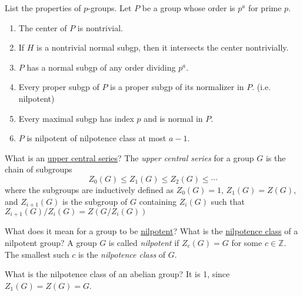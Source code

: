 \documentclass[avery5371,grid]{flashcards}
\newcommand{\Z}{\mathbb{Z}}
\begin{document}
\begin{flashcard}[Groups]{List the properties of $p$-groups.}
Let $P$ be a group whose order is $p^a$ for prime $p$.
 \begin{enumerate}
      \item The center of $P$ is nontrivial.
      \item If $H$ is a nontrivial normal subgp, then it intersects the center nontrivially.
      \item $P$ has a normal subgp of any order dividing $p^a$.
      \item Every proper subgp of $P$ is a proper subgp of its normalizer in $P$. (i.e. nilpotent)
      \item Every maximal subgp has index $p$ and is normal in $P$.
      \item $P$ is nilpotent of nilpotence class at most $a-1$.
 \end{enumerate}
\end{flashcard}

\begin{flashcard}[Groups]{What is an \underline{upper central series}?}
 The \emph{upper central series} for a group $G$ is the chain of subgroups
 $$
 Z_0(G) \leq Z_1(G) \leq Z_2(G) \leq \cdots
 $$
 where the subgroups are inductively defined as $Z_0(G) = 1$, $Z_1(G) = Z(G)$, and $Z_{i+1}(G)$ is the subgroup of $G$ containing $Z_i(G)$ such that $Z_{i+1}(G)/Z_i(G) = Z(G/Z_i(G))$
\end{flashcard}

\begin{flashcard}[Groups]{What does it mean for a group to be \underline{nilpotent}? What is the \underline{nilpotence class} of a nilpotent group?}
 A group $G$ is called \emph{nilpotent} if $Z_c(G) = G$ for some $c \in \Z$. The smallest such $c$ is the \emph{nilpotence class} of $G$.
\end{flashcard}

\begin{flashcard}[Groups]{What is the nilpotence class of an abelian group?}
 It is 1, since $Z_1(G) = Z(G) = G$.
\end{flashcard}
\end{document}
